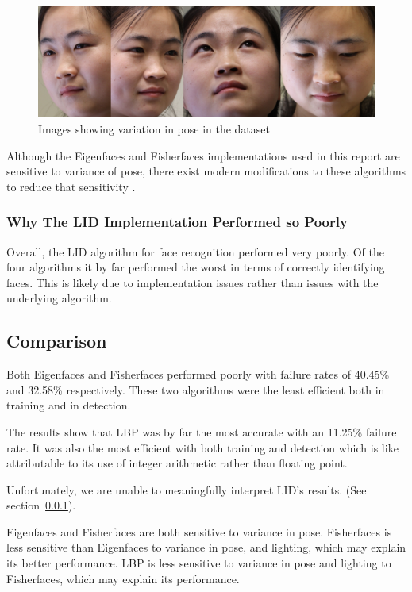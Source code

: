 \documentclass{article}
\begin{document}
\begin{figure}[H]
\centering
\includegraphics[width=0.7\linewidth]{./pose}
\caption{Images showing variation in pose in the dataset}
\label{fig:pose}
\end{figure} %

Although the Eigenfaces and Fisherfaces implementations used in this report are sensitive to variance of pose, there exist modern modifications to these algorithms to reduce that sensitivity \cite{jaiswal2012local}.

\subsubsection{Why The LID Implementation Performed so Poorly}
\label{sec:lidbad}
Overall, the LID algorithm for face recognition performed very poorly. Of the four algorithms it by far performed the worst in terms of correctly identifying faces. This is likely due to implementation issues rather than issues with the underlying algorithm.

\subsection{Comparison}
Both Eigenfaces and Fisherfaces performed poorly with failure rates of 40.45\% and 32.58\% respectively. These two algorithms were the least efficient both in training and in detection.

The results show that LBP was by far the most accurate with an 11.25\% failure rate. It was also the most efficient with both training and detection which is like attributable to its use of integer arithmetic rather than floating point.

Unfortunately, we are unable to meaningfully interpret LID's results. (See section~\ref{sec:lidbad}).

Eigenfaces and Fisherfaces are both sensitive to variance in pose. Fisherfaces is less sensitive than Eigenfaces to variance in pose, and lighting, which may explain its better performance. LBP is less sensitive to variance in pose and lighting to Fisherfaces, which may explain its performance.
\end{document}
